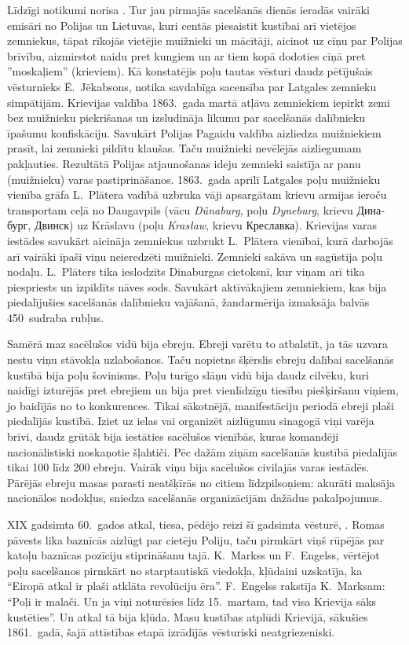\documentclass[twoside,a5paper,12pt,fleqn,openany]{extbook}
\newcommand{\pltxti}[1]{\textit{\textpolish{#1}}}
\newcommand{\rutxti}[1]{\textrussian{#1}}
\newcommand{\detxti}[1]{\textit{\textgerman{#1}}}
\begin{document}
Līdzīgi notikumi norisa . Tur jau pirmajās sacelšanās dienās ieradās vairāki emisāri no Polijas un Lietuvas, kuri centās piesaistīt kustībai arī vietējos zemniekus, tāpat rīkojās vietējie muižnieki un mācītāji, aicinot uz cīņu par Polijas brīvību, aizmirstot naidu pret kungiem un ar tiem kopā dodoties cīņā pret ''moskaļiem'' (krieviem). Kā konstatējis poļu tautas vēsturi daudz pētījušais vēsturnieks Ē.~Jēkabsons, notika savdabīga sacensība par Latgales zemnieku simpātijām. Krievijas valdība 1863.~gada martā atļāva zemniekiem iepirkt zemi bez muižnieku piekrišanas un izsludināja likumu par sacelšanās dalībnieku īpašumu konfiskāciju. Savukārt Polijas Pagaidu valdība aizliedza muižniekiem prasīt, lai zemnieki pildītu klaušas. Taču muižnieki nevēlējās aizliegumam pakļauties. Rezultātā Polijas atjaunošanas ideju zemnieki saistīja ar panu (muižnieku) varas pastiprināšanos. 1863.~gada aprīlī Latgales poļu muižnieku vienība grāfa L.~Plātera vadībā uzbruka vāji apsargātam krievu armijas ieroču transportam ceļā no Daugavpils (vācu \detxti{Dünaburg}, poļu \pltxti{Dyneburg}, krievu \rutxti{Динабург}, \rutxti{Двинск}) uz Krāslavu (poļu \pltxti{Krasław}, krievu \rutxti{Креславка}). Krievijas varas iestādes savukārt aicināja zemniekus uzbrukt L.~Plātera vienībai, kurā darbojās arī vairāki īpaši viņu neieredzēti muižnieki. Zemnieki sakāva un sagūstīja poļu nodaļu. L.~Plāters tika ieslodzīts Dinaburgas cietoksnī, kur viņam arī tika piespriests un izpildīts nāves sods. Savukārt aktīvākajiem zemniekiem, kas bija piedalījušies sacelšanās dalībnieku vajāšanā, žandarmērija izmaksāja balvās 450~sudraba rubļus.

Samērā maz sacēlušos vidū bija ebreju. Ebreji varētu to atbalstīt, ja tās uzvara nestu viņu stāvokļa uzlabošanos. Taču nopietns šķērslis ebreju dalībai sacelšanās kustībā bija poļu šovinisms. Poļu turīgo slāņu vidū bija daudz cilvēku, kuri naidīgi izturējās pret ebrejiem un bija pret vienlīdzīgu tiesību piešķiršanu viņiem, jo baidījās no to konkurences. Tikai sākotnējā, manifestāciju periodā ebreji plaši piedalījās kustībā. Iziet uz ielas vai organizēt aizlūgumu sinagogā viņi varēja brīvi, daudz grūtāk bija iestāties sacēlušos vienībās, kuras komandēji nacionālistiski noskaņotie šļahtiči. Pēc dažām ziņām sacelšanās kustībā piedalījās tikai 100 līdz 200 ebreju. Vairāk viņu bija sacēlušos civilajās varas iestādēs. Pārējās ebreju masas parasti neatšķīrās no citiem līdzpilsoņiem: akurāti maksāja nacionālos nodokļus, sniedza sacelšanās organizācijām dažādus pakalpojumus.

XIX gadsimta 60.~gados atkal, tiesa, pēdējo reizi šī gadsimta vēsturē, . Romas pāvests lika baznīcās aizlūgt par cietēju Poliju, taču pirmkārt viņš rūpējās par katoļu baznīcas pozīciju stiprināšanu tajā. K.~Markss un F.~Engelss, vērtējot poļu sacelšanos pirmkārt no starptautiskā viedokļa, kļūdaini uzskatīja, ka ``Eiropā atkal ir plaši atklāta revolūciju ēra''. F.~Engelss rakstīja K.~Marksam: ``Poļi ir malači. Un ja viņi noturēsies līdz 15.~martam, tad visa Krievija sāks kustēties''. Un atkal tā bija kļūda. Masu kustības atplūdi Krievijā, sākušies 1861.~gadā, šajā attīstības etapā izrādījās vēsturiski neatgriezeniski.
\end{document}
